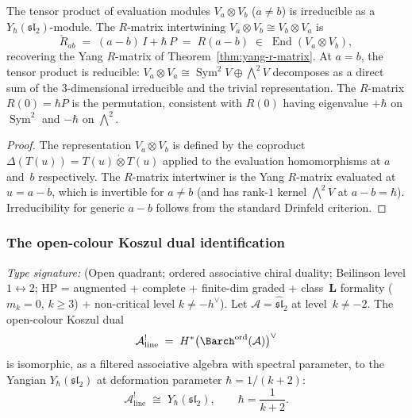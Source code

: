 \begin{proposition}
\label{prop:eval-tensor-sl2}
The tensor product of evaluation modules $V_a\otimes V_b$ ($a\neq b$) is
irreducible as a $Y_\hbar(\mathfrak{sl}_2)$-module. The
$R$-matrix intertwining $V_a\otimes V_b\cong V_b\otimes V_a$ is
\begin{equation}\label{eq:eval-r-sl2}
\check R_{ab}\;=\;(a-b)\,I+\hbar\,P\;=\;R(a-b)
\;\in\;\operatorname{End}(V_a\otimes V_b),
\end{equation}
recovering the Yang $R$-matrix of Theorem~\ref{thm:yang-r-matrix}. At
$a=b$, the tensor product is reducible:
$V_a\otimes V_a\cong \operatorname{Sym}^2 V\oplus\bigwedge^2 V$ decomposes
as a direct sum of the $3$-dimensional irreducible and the trivial
representation. The $R$-matrix $R(0)=\hbar P$ is the
permutation, consistent with $R(0)$ having eigenvalue
$+\hbar$ on $\operatorname{Sym}^2$ and $-\hbar$ on $\bigwedge^2$.
\end{proposition}

\begin{proof}
The representation $V_a\otimes V_b$ is defined by the coproduct
$\Delta(T(u))=T(u)\dot\otimes T(u)$ applied to the evaluation
homomorphisms at $a$ and~$b$ respectively. The $R$-matrix
intertwiner is the Yang $R$-matrix evaluated at $u=a-b$, which is
invertible for $a\neq b$ (and has rank-$1$ kernel $\bigwedge^2 V$ at
$a-b=\hbar$). Irreducibility for generic $a-b$ follows from the
standard Drinfeld criterion.
\end{proof}

\subsubsection*{The open-colour Koszul dual identification}

\begin{theorem}
\label{thm:sl2-open-colour-yangian-dual}
\emph{Type signature:} (Open quadrant; ordered associative chiral
duality; Beilinson level $1\!\leftrightarrow\!2$; HP = augmented +
complete + finite-dim graded + class~$\mathbf L$ formality
($m_k = 0$, $k\ge 3$) + non-critical level $k\neq -h^\vee$).
Let $\mathcal A=\widehat{\mathfrak{sl}}_2$ at level~$k\neq -2$. The
open-colour Koszul dual
\[
\mathcal A^!_{\mathrm{line}}
\;=\;
H^*\bigl({\Barch}^{\mathrm{ord}}(\mathcal A)\bigr)^\vee
\]
is isomorphic, as a filtered associative algebra with spectral parameter,
to the Yangian $Y_\hbar(\mathfrak{sl}_2)$ at deformation parameter
$\hbar=1/(k+2)$:
\begin{equation}\label{eq:koszul-dual-id-sl2}
\boxed{
\mathcal A^!_{\mathrm{line}}
\;\cong\;
Y_\hbar(\mathfrak{sl}_2),
\qquad
\hbar=\frac{1}{k+2}.
}
\end{equation}
\end{theorem}


